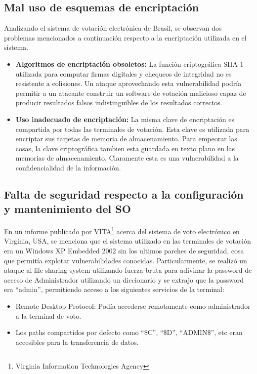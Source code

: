 \subsection{Mal uso de esquemas de encriptación}
Analizando el sistema de votación electrónica de Brasil, se observan dos problemas mencionados a continuación respecto a la encriptación utilizada en el sistema\cite{aranha}.
\begin{itemize}
	\item \textbf{Algoritmos de encriptación obsoletos:} La función criptográfica SHA-1 utilizada para computar firmas digitales y chequeos de integridad no es resistente a colisiones. Un ataque aprovechando esta vulnerabilidad podría permitir a un atacante construir un software de votación malicioso capaz de producir resultados falsos indistinguibles de los resultados correctos.
	\item \textbf{Uso inadecuado de encriptación: } La misma clave de encriptación es compartida por todas las terminales de votación. Esta clave es utilizada para encriptar sus tarjetas de memoria de almacenamiento. Para empeorar las cosas, la clave criptográfica tambien esta guardada en texto plano en las memorias de almacenamiento. Claramente esta es una vulnerabilidad a la confidencialidad de la información.
\end{itemize}


\subsection{Falta de seguridad respecto a la configuración y mantenimiento del SO}
En un informe publicado por VITA\footnote{Virginia Information Technologies Agency} acerca del sistema de voto electrónico en Virginia, USA, se menciona que el sistema utilizado en las terminales de votación era un Windows XP Embedded 2002 sin los ultimos parches de seguridad, cosa que permitía explotar vulnerabilidades conocidas. Particularmente, se realizó un ataque al file-sharing system utilizando fuerza bruta para adivinar la password de acceso de Administrador utilizando un  diccionario y se extrajo que la password era ``admin'', permitiendo acceso a los siguientes servicios de la terminal:

\begin{itemize}
	\item Remote Desktop Protocol: Podía accederse remotamente como administrador a la terminal de voto.
	\item Los paths compartidos por defecto como ``\$C'', ``\$D'', ``ADMIN\$'', etc eran accesibles para la transferencia de datos.
\end{itemize}

